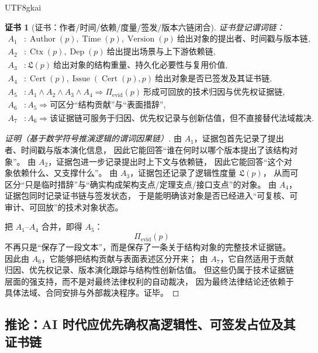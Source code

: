 \documentclass[12pt]{article}
\newtheorem{Certificate}{证书}[section]
\newcommand{\Cert}{\operatorname{Cert}}
\newcommand{\Issue}{\operatorname{Issue}}
\begin{document}
\begin{CJK*}{UTF8}{gkai}
\begin{Certificate}[证书：作者/时间/依赖/度量/签发/版本六链闭合]
\label{cert:tex37-ch16-attribution}
证书登记谓词链：
\[
\begin{aligned}
  A_1 &: \operatorname{Author}(p),\operatorname{Time}(p),\operatorname{Version}(p)
  \ \text{给出对象的提出者、时间戳与版本链},\\
  A_2 &: \operatorname{Ctx}(p),\operatorname{Dep}(p)
  \ \text{给出提出场景与上下游依赖链},\\
  A_3 &: \mathfrak L(p)
  \ \text{给出对象的结构重量、持久化必要性与复用价值},\\
  A_4 &: \Cert(p),\Issue(\Cert(p),p)
  \ \text{给出对象是否已签发及其证书链},\\
  A_5 &: A_1\wedge A_2\wedge A_3\wedge A_4
  \Rightarrow
  \Pi_{\mathrm{evid}}(p)\ \text{形成可回放的技术归因与优先权证据链},\\
  A_6 &: A_5\Rightarrow \text{可区分“结构贡献”与“表面措辞”},\\
  A_7 &: A_6\Rightarrow \text{该证据链可服务于归因、优先权记录与创新估值，但不直接替代法域裁决}.
\end{aligned}
\]
\end{Certificate}

\begin{proof}[证明（基于数学符号推演逻辑的谓词因果链）]
由 $A_1$，证据包首先记录了提出者、时间戳与版本演化信息，
因此它能回答“谁在何时以哪个版本提出了该结构对象”。
由 $A_2$，证据包进一步记录提出时上下文与依赖链，
因此它能回答“这个对象依赖什么、又支撑什么”。
由 $A_3$，证据包还记录了逻辑性度量 $\mathfrak L(p)$，
从而可区分“只是临时措辞”与“确实构成架构支点/定理支点/接口支点”的对象。
由 $A_4$，证据包同时记录证书链与签发状态，
于是能明确该对象是否已经进入“可复核、可审计、可回放”的技术对象状态。

把 $A_1$--$A_4$ 合并，即得 $A_5$：
\[
  \Pi_{\mathrm{evid}}(p)
\]
不再只是“保存了一段文本”，而是保存了一条关于结构对象的完整技术证据链。
因此由 $A_6$，它能够把结构贡献与表面表述区分开来；
由 $A_7$，它自然适用于贡献归因、优先权记录、版本演化跟踪与结构性创新估值。
但这些仍属于技术证据链层面的强支持，而不是对最终法律权利的自动裁决，
因为最终法律结论还依赖于具体法域、合同安排与外部裁决程序。证毕。
\end{proof}

\subsection{推论：AI 时代应优先确权高逻辑性、可签发占位及其证书链}
\label{subsec:tex37-ch16-corollary}


\end{CJK*}
\end{document}
